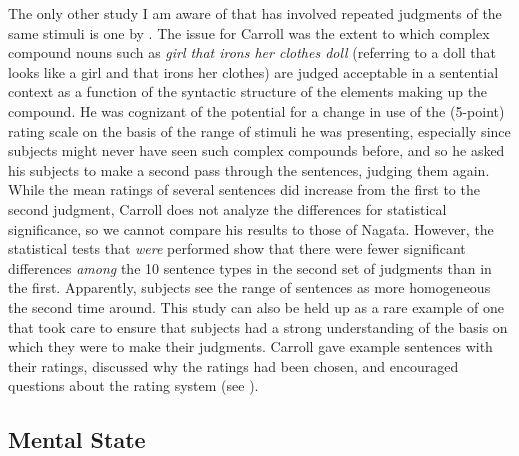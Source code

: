 The only other study I am aware of that has involved repeated judgments of the same stimuli is one by \citet{Carroll1979}. The issue for Carroll was the extent to which complex compound nouns such as \textit{girl that irons her clothes doll} (referring to a doll that looks like a girl and that irons her clothes) are judged acceptable in a sentential context as a function of the syntactic structure of the elements making up the compound. He was cognizant of the potential for a change in use of the
(5-point) rating scale on the basis of the range of stimuli he was presenting, especially since subjects might never have seen such complex compounds before, and so he asked his subjects to make a second pass through  the sentences, judging them again. While the mean ratings of several sentences did increase from the first to the second judgment, Carroll does not analyze the differences for statistical significance, so we cannot compare his results to those of Nagata. However, the statistical tests that \textit{were} performed show that there were fewer significant differences \textit{among} the 10 sentence types in the second set of judgments than in the first. Apparently, subjects see the range of sentences as more homogeneous the second time around. This study can also be held up as a rare example of one that took care to ensure that subjects had a strong understanding of the basis on which they were to make their judgments. Carroll gave example sentences with their ratings, discussed why the ratings had been chosen, and encouraged questions about the rating  system (see \citealt[874\textendash{}875]{Carroll1979}).

\subsection{Mental State}\label{sec:5.2.4}


